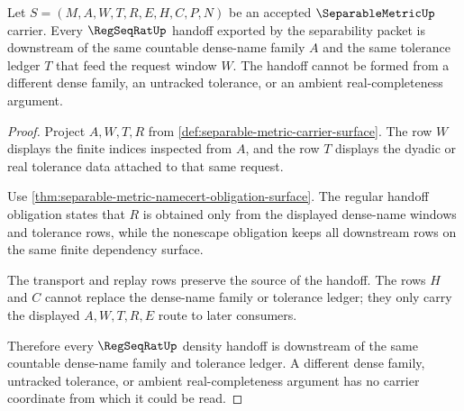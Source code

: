 \begin{theorem}
\label{thm:separable-metric-regseqrat-density-handoff}
Let $S=(M,A,W,T,R,E,H,C,P,N)$ be an accepted $\SeparableMetricUp$ carrier. Every $\RegSeqRatUp$ handoff exported by the separability packet is downstream of the same countable dense-name family $A$ and the same tolerance ledger $T$ that feed the request window $W$. The handoff cannot be formed from a different dense family, an untracked tolerance, or an ambient real-completeness argument.
\end{theorem}
\begin{proof}
Project $A,W,T,R$ from \autoref{def:separable-metric-carrier-surface}. The row $W$ displays the finite indices inspected from $A$, and the row $T$ displays the dyadic or real tolerance data attached to that same request.

Use \autoref{thm:separable-metric-namecert-obligation-surface}. The regular handoff obligation states that $R$ is obtained only from the displayed dense-name windows and tolerance rows, while the nonescape obligation keeps all downstream rows on the same finite dependency surface.

The transport and replay rows preserve the source of the handoff. The rows $H$ and $C$ cannot replace the dense-name family or tolerance ledger; they only carry the displayed $A,W,T,R,E$ route to later consumers.

Therefore every $\RegSeqRatUp$ density handoff is downstream of the same countable dense-name family and tolerance ledger. A different dense family, untracked tolerance, or ambient real-completeness argument has no carrier coordinate from which it could be read.
\end{proof}

